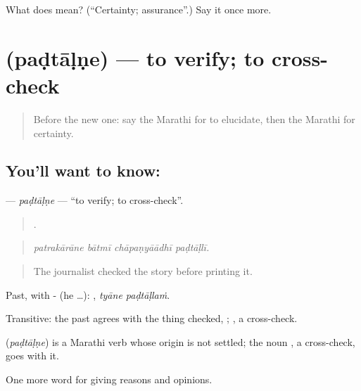 \begin{tcolorbox}[breakable,colback=teal!4,colframe=teal!35!black,title={Before you move on}]
What does  mean? (\textquotedblleft{}Certainty; assurance\textquotedblright{}.) Say it once more.
\end{tcolorbox}
\section[\texorpdfstring{\mr{पडताळणे} (paḍtāḷṇe)}{पडताळणे (paḍtāḷṇe)}]{ (paḍtāḷṇe) — to verify; to cross-check}

\label{lesson:MR-C346-padtalne}



\begin{quote}
Before the new one: say the Marathi for to elucidate, then the Marathi for certainty.
\end{quote}

\subsection*{You'll want to know: }
\textbf{} — \emph{paḍtāḷṇe} — \textquotedblleft{}to verify; to cross-check\textquotedblright{}.

\begin{quote}
   .
\end{quote}

\begin{quote}
\emph{patrakārāne bātmī chāpaṇyāādhī paḍtāḷlī.}
\end{quote}

\begin{quote}
The journalist checked the story before printing it.
\end{quote}

Past, with - (he …):  , \emph{tyāne paḍtāḷlaṁ}.

Transitive: the past agrees with the thing checked,  ; , a cross-check.

\begin{cousinweb}
\textbf{} (\emph{paḍtāḷṇe}) is a Marathi verb whose origin is not settled; the noun , a cross-check, goes with it.
\end{cousinweb}

\begin{grammarlens}[title={What you've built}]
One more word for giving reasons and opinions.
\end{grammarlens}

